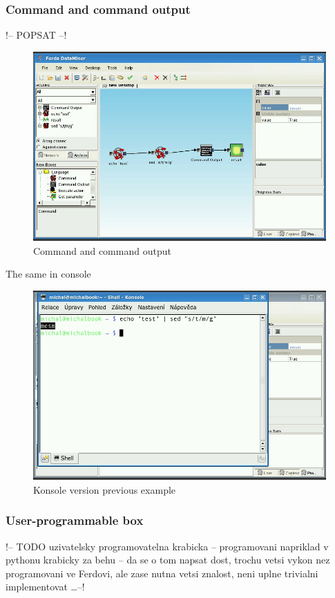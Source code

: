 \documentclass[a4paper,12pt]{book}
\begin{document}
\subsubsection{Command and command output}
!-- POPSAT --!
\begin{figure}
	\includegraphics[width=1\textwidth]{command2.png}
	\caption{Command and command output}
\end{figure}

The same in console
\begin{figure}
	\includegraphics[width=1\textwidth]{command3.png}
	\caption{Konsole version previous example}
\end{figure}

\subsubsection{User-programmable box}
!-- TODO uzivatelsky programovatelna krabicka -- programovani napriklad v pythonu krabicky za behu -- da se o tom napsat dost, trochu vetsi vykon nez programovani ve Ferdovi, ale zase nutna vetsi znalost, neni uplne trivialni implementovat \dots  --!
\end{document}
